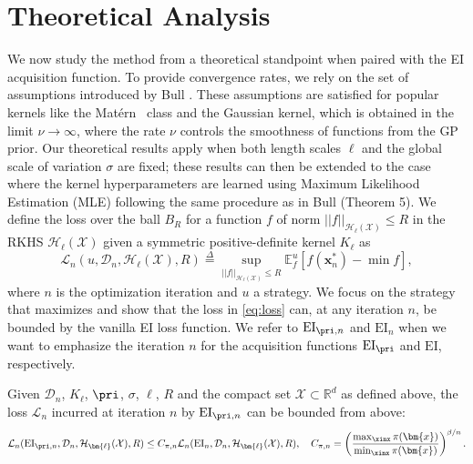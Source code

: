 
\section{Theoretical Analysis} \label{sec:theory_full}
We now study the \method method from a theoretical standpoint when paired with the EI acquisition function. 
To provide convergence rates, we rely on the set of assumptions introduced by Bull \cite{JMLR:v12:bull11a}. 
These assumptions are satisfied for popular kernels like the Matérn~\cite{matern1960spatial} class and the Gaussian kernel, which is obtained in the limit $\nu \rightarrow \infty$, 
where the rate $\nu$ controls the smoothness of functions from the GP prior.
Our theoretical results apply when both length scales ${\bm{\ell}}$ and the global scale of variation $\sigma$ are fixed; these results can then be extended to the case where the kernel hyperparameters are learned using Maximum Likelihood Estimation (MLE) following the same procedure as in Bull \cite{JMLR:v12:bull11a} (Theorem 5).
We define the loss over the ball $B_R$ for a function $f$ of norm $||f||_{\mathcal{H}_{\bm{\ell}}(\mathcal{X})} \leq R$ in the RKHS $\mathcal{H}_{\bm{\ell}}(\mathcal{X})$ given a symmetric positive-definite kernel $K_{\bm{\ell}}$ as
\begin{equation} \label{eq:loss}
    \mathcal{L}_{n}(u, \mathcal{D}_n, \mathcal{H}_{\bm{\ell}}(\mathcal{X}), R) \overset{\Delta}{=} \sup_{{||f||}_{\mathcal{H}_{\bm{\ell}}(\mathcal{X})}\leq R}\mathbb{E}^u_f[f(\bm{x}^*_n) - \min f],
\end{equation}
where $n$ is the optimization iteration and $u$ a strategy.
We focus on the strategy that maximizes \pei{} and show that the loss in \eqref{eq:loss} can, at any iteration $n$, be bounded by the vanilla EI loss function. 
We refer to $\text{EI}_{\pri, n}$ and $\text{EI}_{n}$ when we want to emphasize the iteration $n$ for the acquisition functions $\text{EI}_{\pri}$ and $\text{EI}$, respectively. 
\begin{theorem} \label{th1}
Given $\mathcal{D}_n$, $K_{\bm{\ell}}$, $\pri$, $\sigma$, ${\bm{\ell}}$, $R$ and the compact set $\mathcal{X}\subset\mathbb{R}^d$ as defined above, the loss $\mathcal{L}_{n}$ incurred at iteration $n$ by $\text{EI}_{\pri, n}$
can be bounded from above:
\begin{equation}
    \mathcal{L}_{n}(\text{EI}_{\pri, n}, \mathcal{D}_n, \mathcal{H}_{\bm{\ell}}(\mathcal{X}), R) \leq C_{\pi, n} \mathcal{L}_{n}(\text{EI}_n, \mathcal{D}_n, \mathcal{H}_{\bm{\ell}}(\mathcal{X}), R), \quad C_{\pi, n} = \left(\frac{\max_{\xinx} \pi(\bm{x})}{\min_{\xinx} \pi(\bm{x})}\right)^{\beta/n}.
\end{equation}
\end{theorem}  

